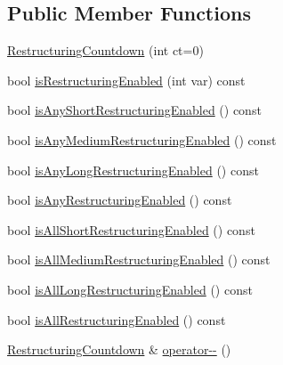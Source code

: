 \subsection*{\-Public \-Member \-Functions}
\begin{DoxyCompactItemize}
\item 
\hyperlink{structcryomesh_1_1manipulators_1_1IClusterAnalyser_1_1RestructuringCountdown_a404e441b64f2b4aa90b02e337d8cd804}{\-Restructuring\-Countdown} (int ct=0)
\item 
bool \hyperlink{structcryomesh_1_1manipulators_1_1IClusterAnalyser_1_1RestructuringCountdown_aa5914738b7868c568f152250cdbbe898}{is\-Restructuring\-Enabled} (int var) const 
\item 
bool \hyperlink{structcryomesh_1_1manipulators_1_1IClusterAnalyser_1_1RestructuringCountdown_a78a6c5da890ad27a0b2a5c6c3b814fd4}{is\-Any\-Short\-Restructuring\-Enabled} () const 
\item 
bool \hyperlink{structcryomesh_1_1manipulators_1_1IClusterAnalyser_1_1RestructuringCountdown_a8b9e3f9ae224384f54082495e00584f0}{is\-Any\-Medium\-Restructuring\-Enabled} () const 
\item 
bool \hyperlink{structcryomesh_1_1manipulators_1_1IClusterAnalyser_1_1RestructuringCountdown_a52d7fee545d90460bbd663798338c759}{is\-Any\-Long\-Restructuring\-Enabled} () const 
\item 
bool \hyperlink{structcryomesh_1_1manipulators_1_1IClusterAnalyser_1_1RestructuringCountdown_a0ea210cdc9eeb6770c062a9729df1104}{is\-Any\-Restructuring\-Enabled} () const 
\item 
bool \hyperlink{structcryomesh_1_1manipulators_1_1IClusterAnalyser_1_1RestructuringCountdown_ac604df5d1355de5ad42ba95a3f63ba57}{is\-All\-Short\-Restructuring\-Enabled} () const 
\item 
bool \hyperlink{structcryomesh_1_1manipulators_1_1IClusterAnalyser_1_1RestructuringCountdown_ab1c0206253593ec5cdaff55432674416}{is\-All\-Medium\-Restructuring\-Enabled} () const 
\item 
bool \hyperlink{structcryomesh_1_1manipulators_1_1IClusterAnalyser_1_1RestructuringCountdown_a11f332249883a3272c5f0cb94cf7b756}{is\-All\-Long\-Restructuring\-Enabled} () const 
\item 
bool \hyperlink{structcryomesh_1_1manipulators_1_1IClusterAnalyser_1_1RestructuringCountdown_aae17ff29ace2561d4ebbce28e9332bca}{is\-All\-Restructuring\-Enabled} () const 
\item 
\hyperlink{structcryomesh_1_1manipulators_1_1IClusterAnalyser_1_1RestructuringCountdown}{\-Restructuring\-Countdown} \& \hyperlink{structcryomesh_1_1manipulators_1_1IClusterAnalyser_1_1RestructuringCountdown_a10e256d5dd68a5d92a4eab35651920d4}{operator-\/-\/} ()

\end{DoxyCompactItemize}
